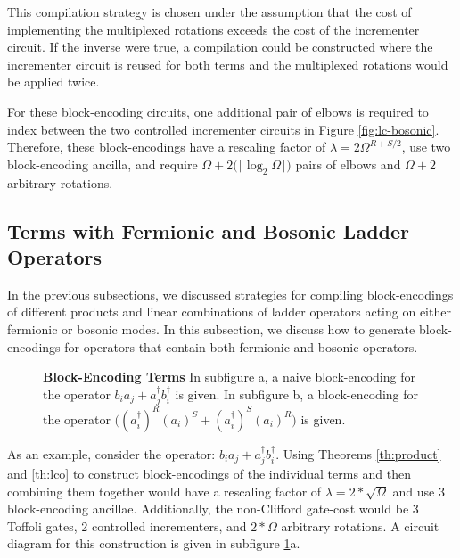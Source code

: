 This compilation strategy is chosen under the assumption that the cost of implementing the multiplexed rotations exceeds the cost of the incrementer circuit.
If the inverse were true, a compilation could be constructed where the incrementer circuit is reused for both terms and the multiplexed rotations would be applied twice.  

For these block-encoding circuits, one additional pair of elbows is required to index between the two controlled incrementer circuits in Figure \ref{fig:lc-bosonic}.
Therefore, these block-encodings have a rescaling factor of $\lambda = 2 \Omega^{R+S/2}$, use two block-encoding ancilla, and require $\Omega + 2\big(\lceil \log_2 \Omega \rceil\big)$ pairs of elbows and $\Omega + 2$ arbitrary rotations.

\subsection{Terms with Fermionic and Bosonic Ladder Operators}

In the previous subsections, we discussed strategies for compiling block-encodings of different products and linear combinations of ladder operators acting on either fermionic or bosonic modes.
In this subsection, we discuss how to generate block-encodings for operators that contain both fermionic and bosonic operators.

\begin{figure}
    
    
    
    \caption{
        \textbf{Block-Encoding Terms}
        In subfigure a, a naive block-encoding for the operator $b_i a_j + a_j^\dagger b_i^\dagger$ is given.
        In subfigure b, a block-encoding for the operator $\big((a_i^\dagger)^R (a_i)^S + (a_i^\dagger)^S (a_i)^R\big)$ is given.
    }
    \label{fig:be-term-example}
\end{figure}


As an example, consider the operator: $b_i a_j + a_j^\dagger b_i^\dagger$.
Using Theorems \ref{th:product} and \ref{th:lco} to construct block-encodings of the individual terms and then combining them together would have a rescaling factor of $\lambda = 2*\sqrt{\Omega}$ and use $3$ block-encoding ancillae.
Additionally, the non-Clifford gate-cost would be $3$ Toffoli gates, 2 controlled incrementers, and $2*\Omega$ arbitrary rotations.
A circuit diagram for this construction is given in subfigure \ref{fig:be-term-example}a.

